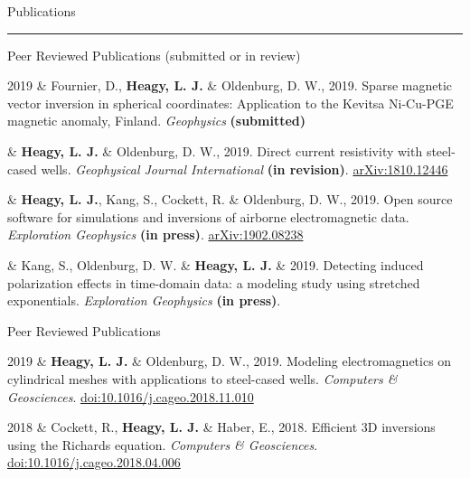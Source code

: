 \documentclass[a4paper, 11pt]{article}
\newcommand{\arxiv}[1]{\href{https://arxiv.org/abs/#1}{arXiv:#1}}
\newcommand{\doi}[1]{\href{https://doi.org/#1}{doi:#1}}
\newcommand{\heading}[1]{
\begin{samepage}
    \vspace{0.5cm}
    {%
    \LARGE
    #1}\\
    \vspace{-0.2cm}
    \hrule
    \vspace{0.2cm}
\end{samepage}
}
\newcommand{\subheading}[1]{
    \vspace{0.3cm}
    {%
    \Large
    #1}\\
    \vspace{0.0cm}
}
\begin{document}
\heading{Publications}

% 
% 

\subheading{Peer Reviewed Publications (submitted or in review)}

\begin{entryright}
2019 & Fournier, D., \textbf{Heagy, L. J.} \& Oldenburg, D. W., 2019. Sparse magnetic vector inversion in spherical coordinates: Application to the Kevitsa Ni-Cu-PGE magnetic anomaly, Finland. \emph{Geophysics} \textbf{(submitted)}
\end{entryright}

\begin{entryright}
& \textbf{Heagy, L. J.} \& Oldenburg, D. W., 2019. Direct current resistivity with steel-cased wells. \emph{Geophysical Journal International} \textbf{(in revision)}. \arxiv{1810.12446}
\end{entryright}

\begin{entryright}
& \textbf{Heagy, L. J.}, Kang, S., Cockett, R. \& Oldenburg, D. W., 2019. Open source software for simulations and inversions of airborne electromagnetic data. \emph{Exploration Geophysics} \textbf{(in press)}. \arxiv{1902.08238}
\end{entryright}

\begin{entryright}
& Kang, S., Oldenburg, D. W. \& \textbf{Heagy, L. J.} \& 2019. Detecting induced polarization effects in time-domain data: a modeling study using stretched exponentials. \emph{Exploration Geophysics} \textbf{(in press)}.
\end{entryright}


\subheading{Peer Reviewed Publications}

\begin{entryright}
2019 & \textbf{Heagy, L. J.} \& Oldenburg, D. W., 2019. Modeling electromagnetics on cylindrical meshes with applications to steel-cased wells. \emph{Computers \& Geosciences}. \doi{10.1016/j.cageo.2018.11.010}
\end{entryright}

\begin{entryright}
2018 & Cockett, R., \textbf{Heagy, L. J.} \& Haber, E., 2018. Efficient 3D inversions using the Richards equation. \emph{Computers \& Geosciences}. \doi{10.1016/j.cageo.2018.04.006}
\end{entryright}
\end{document}
